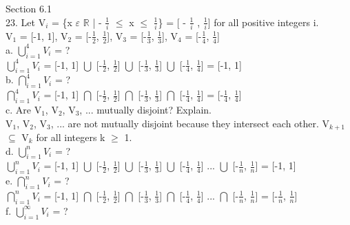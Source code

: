 \documentclass{article}
\begin{document}
Section 6.1\\
23. Let V$_i$ = \{x $\varepsilon$ $\mathbb{R}$ |  - {\Large  $\frac{1}{i}$} $\leq$ x $\leq$ {\Large  $\frac{1}{i}$}\} = [ - {\Large  $\frac{1}{i}$} ,  {\Large  $\frac{1}{i}$}] for all positive integers i. \\
V$_1$ = [-1, 1], V$_2$ = [-{\Large  $\frac{1}{2}$}, {\Large  $\frac{1}{2}$}], V$_3$ = [-{\Large  $\frac{1}{3}$}, {\Large  $\frac{1}{3}$}], V$_4$ = [-{\Large  $\frac{1}{4}$}, {\Large  $\frac{1}{4}$}] \\
a. $\bigcup\limits_{i=1}^{4} V_{i}$ = ? \\
$\bigcup\limits_{i=1}^{4} V_{i}$ = [-1, 1] $\bigcup$ [-{\Large  $\frac{1}{2}$}, {\Large  $\frac{1}{2}$}] $\bigcup$ [-{\Large  $\frac{1}{3}$}, {\Large  $\frac{1}{3}$}] $\bigcup$ [-{\Large  $\frac{1}{4}$}, {\Large  $\frac{1}{4}$}]  = [-1, 1] \\
b. $\bigcap\limits_{i=1}^{4} V_{i}$ = ? \\
$\bigcap\limits_{i=1}^{4} V_{i}$ = [-1, 1] $\bigcap$ [-{\Large  $\frac{1}{2}$}, {\Large  $\frac{1}{2}$}] $\bigcap$ [-{\Large  $\frac{1}{3}$}, {\Large  $\frac{1}{3}$}] $\bigcap$ [-{\Large  $\frac{1}{4}$}, {\Large  $\frac{1}{4}$}]  = [-{\Large  $\frac{1}{4}$}, {\Large  $\frac{1}{4}$}] \\
c. Are V$_1$, V$_2$, V$_3$, ... mutually disjoint? Explain. \\
V$_1$, V$_2$, V$_3$, ... are not mutually disjoint because they intersect each other. V$_{k + 1}$ $\subseteq$ V$_{k}$ for all integers k $\geq$ 1. \\
d. $\bigcup\limits_{i=1}^{n} V_{i}$ = ? \\
$\bigcup\limits_{i=1}^{n} V_{i}$ = [-1, 1] $\bigcup$ [-{\Large  $\frac{1}{2}$}, {\Large  $\frac{1}{2}$}] $\bigcup$ [-{\Large  $\frac{1}{3}$}, {\Large  $\frac{1}{3}$}] $\bigcup$ [-{\Large  $\frac{1}{4}$}, {\Large  $\frac{1}{4}$}] ... $\bigcup$ [-{\Large  $\frac{1}{n}$}, {\Large  $\frac{1}{n}$}] = [-1, 1] \\
e. $\bigcap\limits_{i=1}^{n} V_{i}$ = ? \\
$\bigcap\limits_{i=1}^{n} V_{i}$ = [-1, 1] $\bigcap$ [-{\Large  $\frac{1}{2}$}, {\Large  $\frac{1}{2}$}] $\bigcap$ [-{\Large  $\frac{1}{3}$}, {\Large  $\frac{1}{3}$}] $\bigcap$ [-{\Large  $\frac{1}{4}$}, {\Large  $\frac{1}{4}$}] ... $\bigcap$ [-{\Large  $\frac{1}{n}$}, {\Large  $\frac{1}{n}$}] = [-{\Large  $\frac{1}{n}$}, {\Large  $\frac{1}{n}$}] \\
f. $\bigcup\limits_{i=1}^{\infty} V_{i}$ = ? \\
\end{document}
